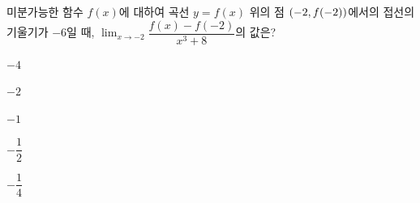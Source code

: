 미분가능한 함수 $f(x)$에 대하여 곡선 $y=f(x)$ 위의 점 $(-2{,}\mkern3mu\mathopen{}f(-2))$에서의 접선의 기울기가 $-6$일 때, $\displaystyle\lim_{x\to -2}\dfrac{f(x)-f(-2)}{x^3+8}$의 값은?
\begin{choices32}{\rule[-3ex]{0pt}{8ex}$-4$}{\rule[-3ex]{0pt}{8ex}$-2$}{\rule[-3ex]{0pt}{8ex}$-1$}{\rule[-3ex]{0pt}{8ex}$-\dfrac{1}{2}$}{\rule[-3ex]{0pt}{8ex}$-\dfrac{1}{4}$}\end{choices32}
